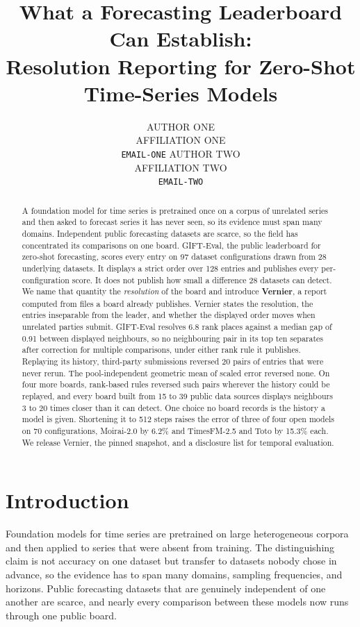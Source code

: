 \documentclass{article}
\title{What a Forecasting Leaderboard Can Establish:\\ Resolution Reporting for Zero-Shot Time-Series Models}
\author{%
  AUTHOR ONE\\
  AFFILIATION ONE\\
  \texttt{EMAIL-ONE}
  \And
  AUTHOR TWO\\
  AFFILIATION TWO\\
  \texttt{EMAIL-TWO}
}
\begin{document}
\maketitle

\begin{abstract}
A foundation model for time series is pretrained once on a corpus of unrelated series and
then asked to forecast series it has never seen, so its evidence must span many domains.
Independent public forecasting datasets are scarce, so
the field has concentrated its comparisons on one board. GIFT-Eval, the public leaderboard
for zero-shot forecasting, scores every entry on 97 dataset configurations drawn from 28
underlying datasets. It displays a strict order over 128 entries and publishes every
per-configuration score. It does not publish how small a difference 28 datasets can detect.
We name that quantity the \emph{resolution} of the board and introduce \textbf{Vernier}, a
report computed from files a board already publishes. Vernier states the resolution, the
entries inseparable from the leader, and whether the displayed order moves when unrelated
parties submit. GIFT-Eval resolves 6.8 rank places against a median gap of 0.91 between
displayed neighbours, so no neighbouring pair in its top ten separates after correction for
multiple comparisons, under either rank rule it publishes. Replaying its history,
third-party submissions reversed 20 pairs of entries that were never rerun. The
pool-independent geometric mean of scaled error reversed none. On four more boards,
rank-based rules reversed such pairs wherever the history could be replayed, and every board
built from 15 to 39 public data sources displays neighbours 3 to 20 times closer than it can detect. One
choice no board records is the history a model is given. Shortening it to 512 steps raises
the error of three of four open models on 70 configurations, Moirai-2.0 by 6.2\% and
TimesFM-2.5 and Toto by 15.3\% each. We release Vernier, the pinned snapshot, and a
disclosure list for temporal evaluation.
\end{abstract}

\section{Introduction}

Foundation models for time series are pretrained on large heterogeneous corpora and then
applied to series that were absent from training. The distinguishing claim is not accuracy
on one dataset but transfer to datasets nobody chose in advance, so the evidence has to
span many domains, sampling frequencies, and horizons. Public forecasting datasets that are
genuinely independent of one another are scarce, and nearly every comparison between these
models now runs through one public board.
\end{document}

